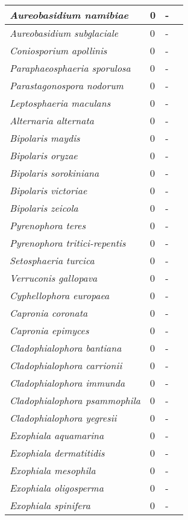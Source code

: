 {\begin{longtable}{| L{4cm} | L{2cm}  | L{5cm} | L{4cm} |}
\textit{Aureobasidium namibiae} & 0 & - & \\ \hline
\textit{Aureobasidium subglaciale} & 0 & - & \\ \hline
\textit{Coniosporium apollinis} & 0 & - & \\ \hline
\textit{Paraphaeosphaeria sporulosa} & 0 & - & \\ \hline
\textit{Parastagonospora nodorum} & 0 & - & \\ \hline
\textit{Leptosphaeria maculans} & 0 & - & \\ \hline
\textit{Alternaria alternata} & 0 & - & \\ \hline
\textit{Bipolaris maydis} & 0 & - & \\ \hline
\textit{Bipolaris oryzae} & 0 & - & \\ \hline
\textit{Bipolaris sorokiniana} & 0 & - & \\ \hline
\textit{Bipolaris victoriae} & 0 & - & \\ \hline
\textit{Bipolaris zeicola} & 0 & - & \\ \hline
\textit{Pyrenophora teres} & 0 & - & \\ \hline
\textit{Pyrenophora tritici-repentis} & 0 & - & \\ \hline
\textit{Setosphaeria turcica} & 0 & - & \\ \hline
\textit{Verruconis gallopava} & 0 & - & \\ \hline
\textit{Cyphellophora europaea} & 0 & - & \\ \hline
\textit{Capronia coronata} & 0 & - & \\ \hline
\textit{Capronia epimyces} & 0 & - & \\ \hline
\textit{Cladophialophora bantiana} & 0 & - & \\ \hline
\textit{Cladophialophora carrionii} & 0 & - & \\ \hline
\textit{Cladophialophora immunda} & 0 & - & \\ \hline
\textit{Cladophialophora psammophila} & 0 & - & \\ \hline
\textit{Cladophialophora yegresii} & 0 & - & \\ \hline
\textit{Exophiala aquamarina} & 0 & - & \\ \hline
\textit{Exophiala dermatitidis} & 0 & - & \\ \hline
\textit{Exophiala mesophila} & 0 & - & \\ \hline
\textit{Exophiala oligosperma} & 0 & - & \\ \hline
\textit{Exophiala spinifera} & 0 & - & \\ \hline

\end{longtable}}
